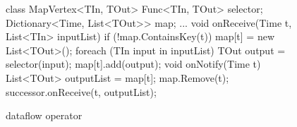 \begin{figure}[t!]
\begin{numcodejava}
class MapVertex<TIn, TOut> {
  Func<TIn, TOut> selector;
  Dictionary<Time, List<TOut>> map;
  ...
  void onReceive(Time t, List<TIn> inputList) {
    if (!map.ContainsKey(t))
       map[t] = new List<TOut>();
    foreach (TIn input in inputList) {
      TOut output = selector(input);
      map[t].add(output);
    }
  }
  void onNotify(Time t) {
     List<TOut> outputList = map[t];
     map.Remove(t);
     successor.onReceive(t, outputList); 
  }
}
\end{numcodejava}
\caption{ dataflow operator}
\label{fig:motivating-eg}
\end{figure}